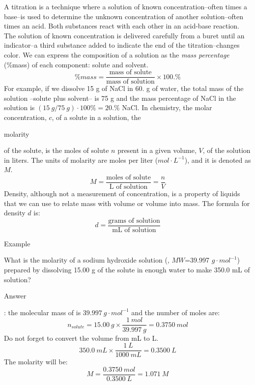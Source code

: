 \documentclass[main.tex]{subfiles}
\begin{document}
\vspace{0.2cm}{\large \bfseries Background}
A titration is a technique where a solution of known concentration--often times a base--is used to determine the unknown concentration of another solution--often times an acid. Both substances react with each other in an acid-base reaction. The solution of known concentration is delivered carefully from a buret until an indicator--a third substance added to indicate the end of the titration--changes color. 
We can express the composition of a solution as the \textit{mass percentage} (\%mass) of each component: solute and solvent.
\[\%mass=\frac{\text{mass of solute}}{\text{mass of solution}}\times 100.\% \]
For example, if we dissolve 15 g of NaCl in 60. g of water, the total mass of the solution --solute plus solvent-- is 75 g and the mass percentage of NaCl in the solution is $(15\:g/75\:g) \cdot 100\%= 20.\%$ NaCl. 
In chemistry, the molar concentration, $c$, of a solute in a solution, the \begin{it}molarity\end{it} of the solute, is the moles of solute $n$ present in a given volume, $V$, of the solution in liters. The units of molarity are moles per liter ($mol\cdot L^{-1}$), and it is denoted as $M$.
\[M=\frac{\text{moles of solute}}{\text{L of solution}}=\frac{n}{V}\]
Density, although not a measurement of concentration, is a property of liquids that we can use to relate mass with volume or volume into mass. The formula for density $d$ is:
\[d=\frac{\text{grams of solution}}{\text{mL of solution}}\]
\begin{center}\begin{example}{Example}
\begin{it}
What is the molarity of a sodium hydroxide solution (, $MW$=39.997 $g\cdot mol^{-1}$) prepared by dissolving 15.00 g of the solute in enough water to make 350.0 mL of solution?
\end{it}
\Sepline
\begin{bf}Answer\end{bf}: the molecular mass of  is $39.997\:g\cdot mol^{-1}$ and the number of  moles are:
\[n_{solute}=15.00\:g\times \frac{1\:mol}{39.997\:g}=0.3750\:mol\]
Do not forget to convert the volume from mL to L.
\[350.0\:mL \times \frac{1\:L}{1000\:mL}=0.3500\:L\]
The molarity will be:
\[M=\frac{0.3750\:mol}{0.3500\:L}=1.071\:M\]
\end{example}\end{center}
\end{document}
